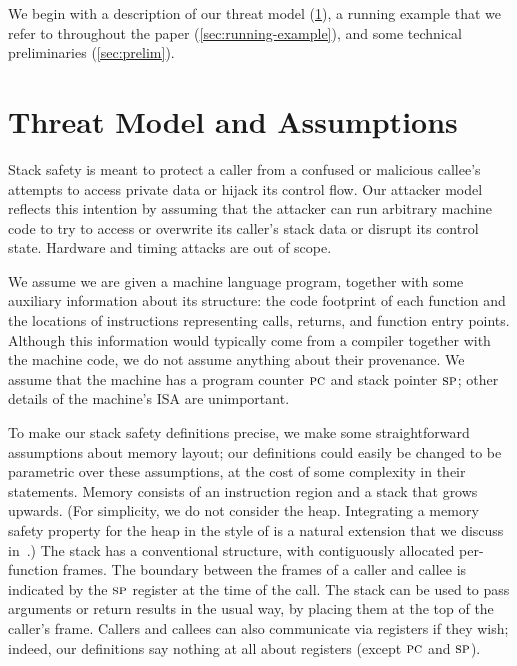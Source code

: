 \documentclass[acmsmall,review,anonymous]{acmart}\settopmatter{printfolios=true,printccs=false,printacmref=false}
\begin{document}
We begin with a description of our threat model
(\cref{sec:threat}), a running example that we refer to throughout the paper
(\cref{sec:running-example}),  and some technical preliminaries
(\cref{sec:prelim}).

\section{Threat Model and Assumptions}
\label{sec:threat}

Stack safety is meant to protect a caller from a confused or malicious callee's
attempts to access private data or hijack its control flow. Our
attacker model reflects this intention by assuming that the attacker
can run arbitrary machine code to try to access or overwrite its caller's stack data
or disrupt its control state.  Hardware and timing attacks are out of
scope.

\newcommand*{\rsp}{\textsc{sp}}

We assume we are given a machine language program, together with some auxiliary information
about its structure: the code footprint of each function and the locations of instructions
representing calls, returns, and function entry points.
Although this information would typically come from a compiler together with
the machine code, we do not
assume anything about their provenance.  We assume that the machine has a
program counter $\textsc{pc}$
and stack pointer $\rsp$; other details of the machine's ISA are unimportant.

To make our stack safety definitions precise, we make some straightforward
assumptions about
memory layout; our definitions could easily be changed to be parametric over
these assumptions, at the cost of some complexity in their statements.  Memory
consists of an instruction region and a stack that grows upwards. (For simplicity,
we do not consider the heap. Integrating a memory safety property for the
heap in the style of
\citet{DBLP:conf/post/AmorimHP18} is a natural extension that we discuss
in~.)  The stack has a conventional structure, with
contiguously allocated per-function frames.
The boundary between the frames of a caller and callee is indicated by the $\rsp$ register
at the time of the call.  The stack can be used to
pass arguments or return results in the usual way, by placing them
at the top of the caller's frame. Callers and callees can also communicate
via registers if they wish; indeed, our
definitions say nothing at all about registers (except $\textsc{pc}$ and
$\rsp$). 
\end{document}
